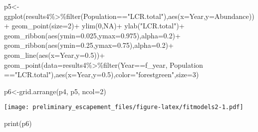 \documentclass[
]{article}
\newenvironment{Shaded}{\begin{snugshade}}{\end{snugshade}}
\newcommand{\AttributeTok}[1]{\textcolor[rgb]{0.77,0.63,0.00}{#1}}
\newcommand{\ConstantTok}[1]{\textcolor[rgb]{0.00,0.00,0.00}{#1}}
\newcommand{\DecValTok}[1]{\textcolor[rgb]{0.00,0.00,0.81}{#1}}
\newcommand{\FloatTok}[1]{\textcolor[rgb]{0.00,0.00,0.81}{#1}}
\newcommand{\FunctionTok}[1]{\textcolor[rgb]{0.00,0.00,0.00}{#1}}
\newcommand{\NormalTok}[1]{#1}
\newcommand{\OtherTok}[1]{\textcolor[rgb]{0.56,0.35,0.01}{#1}}
\newcommand{\SpecialCharTok}[1]{\textcolor[rgb]{0.00,0.00,0.00}{#1}}
\newcommand{\StringTok}[1]{\textcolor[rgb]{0.31,0.60,0.02}{#1}}
\begin{document}
\begin{Shaded}
\begin{Highlighting}[]
\NormalTok{p5}\OtherTok{\textless{}{-}}\FunctionTok{ggplot}\NormalTok{(results4}\SpecialCharTok{\%\textgreater{}\%}\FunctionTok{filter}\NormalTok{(Population}\SpecialCharTok{==}\StringTok{"LCR.total"}\NormalTok{),}\FunctionTok{aes}\NormalTok{(}\AttributeTok{x=}\NormalTok{Year,}\AttributeTok{y=}\NormalTok{Abundance))}\SpecialCharTok{+}
  \FunctionTok{geom\_point}\NormalTok{(}\AttributeTok{size=}\DecValTok{2}\NormalTok{)}\SpecialCharTok{+}
  \FunctionTok{ylim}\NormalTok{(}\DecValTok{0}\NormalTok{,}\ConstantTok{NA}\NormalTok{)}\SpecialCharTok{+}
  \FunctionTok{ylab}\NormalTok{(}\StringTok{"LCR.total"}\NormalTok{)}\SpecialCharTok{+}
  \FunctionTok{geom\_ribbon}\NormalTok{(}\FunctionTok{aes}\NormalTok{(}\AttributeTok{ymin=}\StringTok{\textasciigrave{}}\AttributeTok{0.025}\StringTok{\textasciigrave{}}\NormalTok{,}\AttributeTok{ymax=}\StringTok{\textasciigrave{}}\AttributeTok{0.975}\StringTok{\textasciigrave{}}\NormalTok{),}\AttributeTok{alpha=}\FloatTok{0.2}\NormalTok{)}\SpecialCharTok{+}
  \FunctionTok{geom\_ribbon}\NormalTok{(}\FunctionTok{aes}\NormalTok{(}\AttributeTok{ymin=}\StringTok{\textasciigrave{}}\AttributeTok{0.25}\StringTok{\textasciigrave{}}\NormalTok{,}\AttributeTok{ymax=}\StringTok{\textasciigrave{}}\AttributeTok{0.75}\StringTok{\textasciigrave{}}\NormalTok{),}\AttributeTok{alpha=}\FloatTok{0.2}\NormalTok{)}\SpecialCharTok{+}
  \FunctionTok{geom\_line}\NormalTok{(}\FunctionTok{aes}\NormalTok{(}\AttributeTok{x=}\NormalTok{Year,}\AttributeTok{y=}\StringTok{\textasciigrave{}}\AttributeTok{0.5}\StringTok{\textasciigrave{}}\NormalTok{))}\SpecialCharTok{+}
  \FunctionTok{geom\_point}\NormalTok{(}\AttributeTok{data=}\NormalTok{results4}\SpecialCharTok{\%\textgreater{}\%}\FunctionTok{filter}\NormalTok{(Year}\SpecialCharTok{==}\NormalTok{f\_year, Population }\SpecialCharTok{==}\StringTok{"LCR.total"}\NormalTok{),}\FunctionTok{aes}\NormalTok{(}\AttributeTok{x=}\NormalTok{Year,}\AttributeTok{y=}\StringTok{\textasciigrave{}}\AttributeTok{0.5}\StringTok{\textasciigrave{}}\NormalTok{),}\AttributeTok{color=}\StringTok{"forestgreen"}\NormalTok{,}\AttributeTok{size=}\DecValTok{3}\NormalTok{)}


\NormalTok{p6}\OtherTok{\textless{}{-}}\FunctionTok{grid.arrange}\NormalTok{(p4, p5, }\AttributeTok{ncol=}\DecValTok{2}\NormalTok{)}
\end{Highlighting}
\end{Shaded}

\texttt{[image: preliminary\_escapement\_files/figure-latex/fitmodels2-1.pdf]}

\begin{Shaded}
\begin{Highlighting}[]
\FunctionTok{print}\NormalTok{(p6)}
\end{Highlighting}
\end{Shaded}
\end{document}
